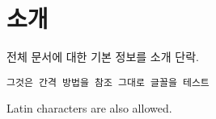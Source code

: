 \documentclass{article}
\begin{document}
\section{소개}
전체 문서에 대한 기본 정보를 소개 단락.
 
\begin{verbatim}
그것은 간격 방법을 참조 그대로 글꼴을 테스트
\end{verbatim}
 
Latin characters are also allowed.
 
\end{document}
